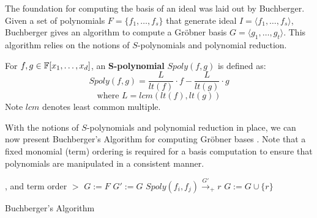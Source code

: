The foundation for computing the \Grobner basis of an ideal was laid out 
by Buchberger\cite{buchberger_thesis}.
Given a set of polynomials $F=\{f_{1},\dots,f_{s}\}$ that generate ideal $I=
\langle f_{1},\dots,f_{s} \rangle$, 
Buchberger gives an algorithm to compute a Gr\"obner basis $G=\langle g_{1},
\dots,g_{t}\rangle$. This algorithm relies on the notions of $S$-polynomials 
and polynomial reduction.

\begin{Definition}
For $f, g \in {\mathbb{F}}[x_1,\dots,x_d]$, an {\bf S-polynomial} $Spoly(f,g)$ is 
defined as:
\begin{equation}
    Spoly(f,g)=\frac{L}{lt(f)}\cdot f - \frac{L}{lt(g)}\cdot g
    \label{eqn:spoly}
\end{equation}
\begin{equation}
\text{where }L = lcm\left(lt(f), lt(g)\right) \nonumber
\end{equation}
Note $lcm$ denotes least common multiple.
\end{Definition}

With the notions of $S$-polynomials and polynomial reduction in place,
we can now present Buchberger's Algorithm 
for computing Gr\"obner bases \cite{buchberger_thesis}. Note that a fixed 
monomial (term) ordering is required for a \Grobner basis 
computation to ensure that polynomials are manipulated in a consistent 
manner.

\begin{algorithm}[H]
\SetAlgoNoLine
 , and term order $>$
  $G:= F$\;
  {
  	$G' := G$\;
	{
		$Spoly(f_{i}, f_{j}) \stackrel{G'}{\textstyle\longrightarrow}_+r$ \;
		{
			$G:= G \cup \{r\}$ \;
		}
	}
   }
\caption {Buchberger's Algorithm}\label{alg:gb}
\end{algorithm}

